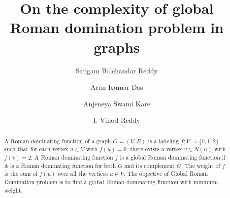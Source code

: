 \documentclass[preprint,12pt]{elsarticle}
\newcommand{\grd}{{\sc Global Roman Domination}}
\begin{document}
\begin{frontmatter}



\title{On the complexity of global Roman domination problem in graphs}




            
\author[label1]{Sangam Balchandar Reddy} 
\author[label1]{Arun Kumar Das} 
\author[label1]{Anjeneya Swami Kare} 
\author[label2]{I. Vinod Reddy} 

\begin{abstract}
A Roman dominating function of a graph $G=(V,E)$ is a labeling $f: V \rightarrow{} \{0 ,1, 2\}$  such that for each vertex $u \in V$ with $f(u) = 0$, there exists a vertex $v \in N(u)$ with $f(v) =2$. A Roman dominating function $f$ is a global Roman dominating function if it is a Roman dominating function for both $G$ and its complement $\overline{G}$. The weight of $f$ is the sum of $f(u)$ over all the vertices $u \in V$. The objective of \grd{} problem is to find a global Roman dominating function with minimum weight. 


\end{abstract}
\end{frontmatter}
\end{document}
